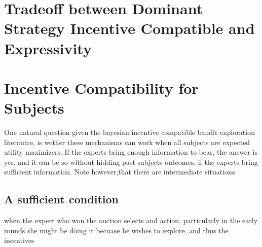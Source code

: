 \section{Tradeoff between Dominant Strategy Incentive Compatible and Expressivity}



\section{Incentive Compatibility for Subjects}

One natural question given the bayesian incentive compatible bandit exploration literautre, is wether these mechanisms can work when all subjects are expected utility maximizers. If the experts bring enough information to bear, the answer is yes, and it can be so without hidding past subjects outcomes, if the experts bring sufficient information. Note however,that there are intermediate situations 

\subsection{A sufficient condition}

when the expert who won the auction selects and action, particularly in the early rounds she might be doing it becuase he wishes to explore, and thus the incentives 



